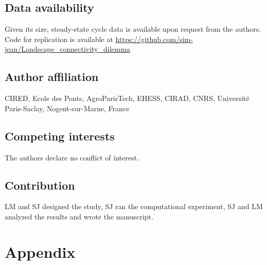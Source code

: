 \subsection*{Data availability}
Given its size, steady-state cycle data is available upon request from the authors. Code for replication is available at \url{https://github.com/sim-jean/Landscape_connectivity_dilemma}

\subsection*{Author affiliation}
CIRED, Ecole des Ponts, AgroParisTech, EHESS, CIRAD, CNRS, Université Paris-Saclay, Nogent-sur-Marne, France
\subsection*{Competing interests}
The authors declare no conflict of interest.

\subsection*{Contribution}
LM and SJ designed the study, SJ ran the computational experiment, SJ and LM analyzed the results and wrote the manuscript.

\newpage

\renewcommand{\thesection}{\Alph{section}}
\setcounter{section}{0}
\renewcommand{\thesubsection}{\Alph{subsection}}


\clearpage
{}
\setcounter{figure}{0}
\setcounter{table}{0}
\setcounter{equation}{0}
\renewcommand{\thesection}{\Alph{section}}
\renewcommand{\thesubsection}{\Alph{subsection}}
\renewcommand{\thefigure}{2.\Alph{figure}}
\renewcommand{\thetable}{2.\Alph{table}}

{}

\section*{Appendix}  %
\renewcommand\theequation{A.\arabic{equation}} %
\setcounter{equation}{0}%

